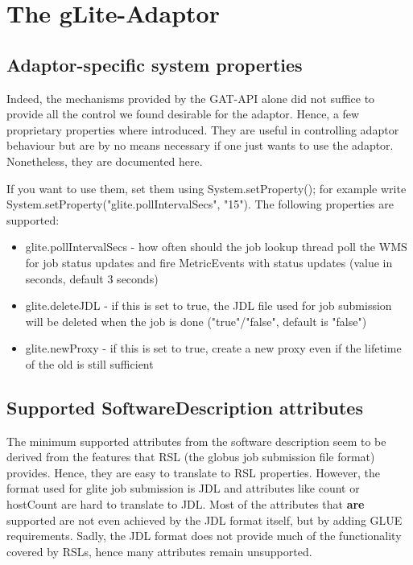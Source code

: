 \documentclass{scrreprt}
\begin{document}
\chapter{The gLite-Adaptor} 

\section{Adaptor-specific system properties}

Indeed, the mechanisms provided by the GAT-API alone did not suffice to provide all the control we found 
desirable for the adaptor. Hence, a few proprietary properties where introduced. They are useful
in controlling adaptor behaviour but are by no means necessary if one just wants to use the adaptor.
Nonetheless, they are documented here.
 
If you want to use them, set them using System.setProperty(); for example write 
System.setProperty("glite.pollIntervalSecs", "15").
The following properties are supported:

\begin{itemize}
 \item glite.pollIntervalSecs - how often should the job lookup thread poll the WMS for job status updates and fire MetricEvents with status updates (value in seconds, default 3 seconds)
 \item glite.deleteJDL - if this is set to true, the JDL file used for job submission will be deleted when the job is done ("true"/"false", default is "false")
 \item glite.newProxy - if this is set to true, create a new proxy even if the lifetime of the old is still sufficient
\end{itemize}

\section{Supported SoftwareDescription attributes}

The minimum supported attributes from the software description seem to be derived from the features
that RSL (the globus job submission file format) provides. Hence, they are easy to translate to RSL 
properties.
However, the format used for glite job submission is JDL and attributes like count or hostCount are
hard to translate to JDL. Most of the attributes that \textbf{are} supported are not even achieved by the JDL
format itself, but by adding GLUE requirements.
Sadly, the JDL format does not provide much of the functionality covered by RSLs, hence many attributes
remain unsupported.
 
\end{document}
